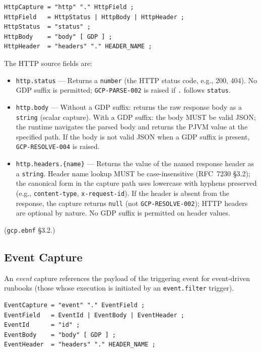 \begin{verbatim}
HttpCapture = "http" "." HttpField ;
HttpField   = HttpStatus | HttpBody | HttpHeader ;
HttpStatus  = "status" ;
HttpBody    = "body" [ GDP ] ;
HttpHeader  = "headers" "." HEADER_NAME ;
\end{verbatim}

\noindent The HTTP source fields are:

\begin{itemize}
  \item \texttt{http.status} --- Returns a \texttt{number}
    (the HTTP status code, e.g., 200, 404).
    No GDP suffix is permitted; \texttt{GCP-PARSE-002} is raised if
    \texttt{.} follows \texttt{status}.

  \item \texttt{http.body} --- Without a GDP suffix: returns the raw
    response body as a \texttt{string} (scalar capture).
    With a GDP suffix: the body MUST be valid JSON;
    the runtime navigates the parsed body and returns the PJVM value
    at the specified path.
    If the body is not valid JSON when a GDP suffix is present,
    \texttt{GCP-RESOLVE-004} is raised.

  \item \texttt{http.headers.\{name\}} --- Returns the value of the named
    response header as a \texttt{string}.
    Header name lookup MUST be case-insensitive (RFC~7230 \S3.2);
    the canonical form in the capture path uses lowercase with hyphens
    preserved (e.g., \texttt{content-type}, \texttt{x-request-id}).
    If the header is absent from the response, the capture returns
    \texttt{null} (not \texttt{GCP-RESOLVE-002});
    HTTP headers are optional by nature.
    No GDP suffix is permitted on header values.
\end{itemize}

(\texttt{gcp.ebnf} \S3.2.)

\subsection{Event Capture}
\label{subsec:gcp:sources:event}

An \emph{event} capture references the payload of the triggering event
for event-driven runbooks (those whose execution is initiated by an
\texttt{event.filter} trigger).

\begin{verbatim}
EventCapture = "event" "." EventField ;
EventField   = EventId | EventBody | EventHeader ;
EventId      = "id" ;
EventBody    = "body" [ GDP ] ;
EventHeader  = "headers" "." HEADER_NAME ;
\end{verbatim}

